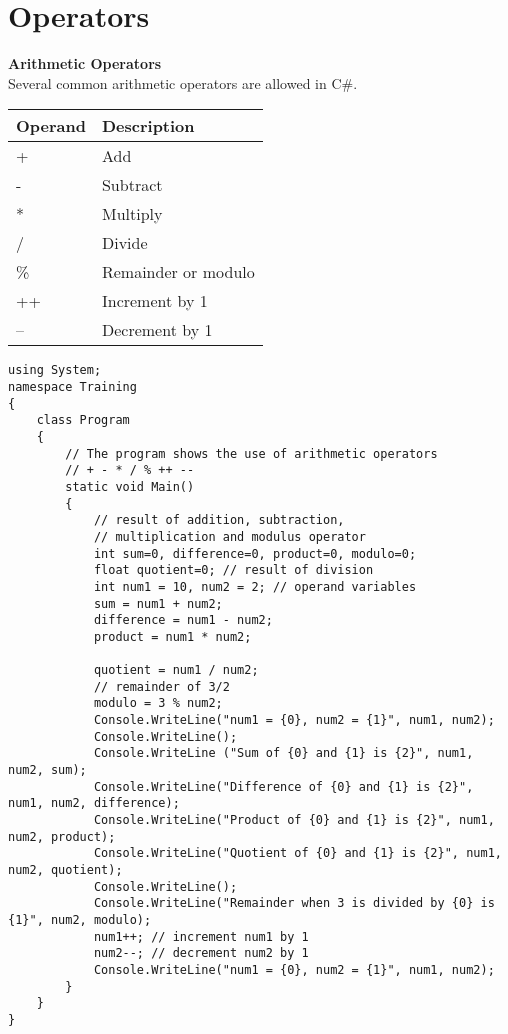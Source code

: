 \section{Operators}
\textbf{Arithmetic Operators}\\

Several common arithmetic operators are allowed in C\#.

\begin{center}
    \begin{tabular}{ | m{5em} | m{10cm} | } 
    \hline
    Operand & Description \\
    \hline
    + & Add\\
    - & Subtract\\
    * & Multiply\\
    / & Divide\\
    \% & Remainder or modulo\\
    ++ & Increment by 1\\
    -- & Decrement by 1\\
    \hline
    \end{tabular}
\end{center}


\begin{lstlisting}
using System;
namespace Training
{
    class Program
    {
        // The program shows the use of arithmetic operators
        // + - * / % ++ --
        static void Main()
        {
            // result of addition, subtraction,
            // multiplication and modulus operator
            int sum=0, difference=0, product=0, modulo=0;
            float quotient=0; // result of division
            int num1 = 10, num2 = 2; // operand variables
            sum = num1 + num2;
            difference = num1 - num2;
            product = num1 * num2;
         
            quotient = num1 / num2;
            // remainder of 3/2
            modulo = 3 % num2;
            Console.WriteLine("num1 = {0}, num2 = {1}", num1, num2);
            Console.WriteLine();
            Console.WriteLine ("Sum of {0} and {1} is {2}", num1, num2, sum);
            Console.WriteLine("Difference of {0} and {1} is {2}", num1, num2, difference);
            Console.WriteLine("Product of {0} and {1} is {2}", num1, num2, product);
            Console.WriteLine("Quotient of {0} and {1} is {2}", num1, num2, quotient);
            Console.WriteLine();
            Console.WriteLine("Remainder when 3 is divided by {0} is {1}", num2, modulo);
            num1++; // increment num1 by 1
            num2--; // decrement num2 by 1
            Console.WriteLine("num1 = {0}, num2 = {1}", num1, num2);
        }
    }
}
\end{lstlisting}

